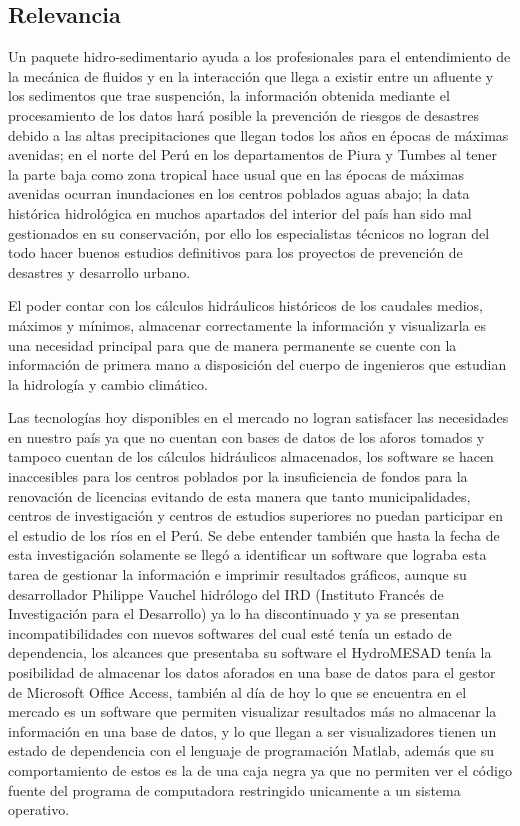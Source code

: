 \documentclass[12pt,a4paper]{report}
\begin{document}
\subsection{Relevancia}
Un paquete hidro-sedimentario ayuda a los profesionales para el entendimiento de la mecánica de fluidos y en la interacción que llega a existir entre un afluente y los sedimentos que trae suspención, la información obtenida mediante el procesamiento de los datos hará posible la prevención de riesgos de desastres debido a las altas precipitaciones que llegan todos los años en épocas de máximas avenidas; en el norte del Perú en los departamentos de Piura y Tumbes al tener la parte baja como zona tropical hace usual que en las épocas de máximas avenidas ocurran inundaciones en los centros poblados aguas abajo; la data histórica hidrológica en muchos apartados del interior del país han sido mal gestionados en su conservación, por ello los especialistas técnicos no logran del todo hacer buenos estudios definitivos para los proyectos de prevención de desastres y desarrollo urbano.

El poder contar con los cálculos hidráulicos históricos de los caudales medios, máximos y mínimos, almacenar correctamente la información y visualizarla es una necesidad principal para que de manera permanente se cuente con la información de primera mano a disposición del cuerpo de ingenieros que estudian la hidrología y cambio climático.

Las tecnologías hoy disponibles en el mercado no logran satisfacer las necesidades en nuestro país ya que no cuentan con bases de datos de los aforos tomados y tampoco cuentan de los cálculos hidráulicos almacenados, los software se hacen inaccesibles para los centros poblados por la insuficiencia de fondos para la renovación de licencias evitando de esta manera que tanto municipalidades, centros de investigación y centros de estudios superiores no puedan participar en el estudio de los ríos en el Perú. Se debe entender también que hasta la fecha de esta investigación solamente se llegó a identificar un software que lograba esta tarea de gestionar la información e imprimir resultados gráficos, aunque su desarrollador Philippe Vauchel hidrólogo del IRD (Instituto Francés de Investigación para el Desarrollo) ya lo ha discontinuado y ya se presentan incompatibilidades con nuevos softwares del cual esté tenía un estado de dependencia, los alcances que presentaba su software el HydroMESAD tenía la posibilidad de almacenar los datos aforados en una base de datos para el gestor de Microsoft Office Access, también al día de hoy lo que se encuentra en el mercado es un software que permiten visualizar resultados más no almacenar la información en una base de datos, y lo que llegan a ser visualizadores tienen un estado de dependencia con el lenguaje de programación Matlab, además que su comportamiento de estos es la de una caja negra ya que no permiten ver el código fuente del programa de computadora restringido unicamente a un sistema operativo.
\end{document}
